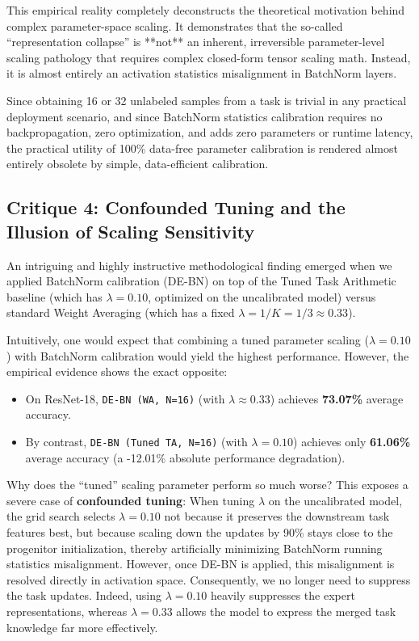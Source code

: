 \documentclass{article}
\begin{document}
This empirical reality completely deconstructs the theoretical motivation behind complex parameter-space scaling. It demonstrates that the so-called ``representation collapse'' is **not** an inherent, irreversible parameter-level scaling pathology that requires complex closed-form tensor scaling math. Instead, it is almost entirely an activation statistics misalignment in BatchNorm layers. 

Since obtaining 16 or 32 unlabeled samples from a task is trivial in any practical deployment scenario, and since BatchNorm statistics calibration requires no backpropagation, zero optimization, and adds zero parameters or runtime latency, the practical utility of 100\% data-free parameter calibration is rendered almost entirely obsolete by simple, data-efficient calibration.

\subsection{Critique 4: Confounded Tuning and the Illusion of Scaling Sensitivity}
An intriguing and highly instructive methodological finding emerged when we applied BatchNorm calibration (DE-BN) on top of the Tuned Task Arithmetic baseline (which has $\lambda = 0.10$, optimized on the uncalibrated model) versus standard Weight Averaging (which has a fixed $\lambda = 1/K = 1/3 \approx 0.33$). 

Intuitively, one would expect that combining a tuned parameter scaling ($\lambda=0.10$) with BatchNorm calibration would yield the highest performance. However, the empirical evidence shows the exact opposite: 
\begin{itemize}
    \item On ResNet-18, \texttt{DE-BN (WA, N=16)} (with $\lambda \approx 0.33$) achieves \textbf{73.07\%} average accuracy.
    \item By contrast, \texttt{DE-BN (Tuned TA, N=16)} (with $\lambda = 0.10$) achieves only \textbf{61.06\%} average accuracy (a -12.01\% absolute performance degradation).
\end{itemize}

Why does the ``tuned'' scaling parameter perform so much worse? This exposes a severe case of \textbf{confounded tuning}:
When tuning $\lambda$ on the uncalibrated model, the grid search selects $\lambda=0.10$ not because it preserves the downstream task features best, but because scaling down the updates by 90\% stays close to the progenitor initialization, thereby artificially minimizing BatchNorm running statistics misalignment. 
However, once DE-BN is applied, this misalignment is resolved directly in activation space. Consequently, we no longer need to suppress the task updates. Indeed, using $\lambda=0.10$ heavily suppresses the expert representations, whereas $\lambda=0.33$ allows the model to express the merged task knowledge far more effectively.
\end{document}
